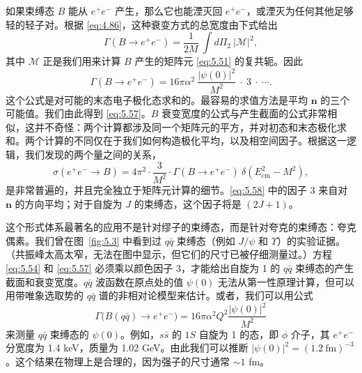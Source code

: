 如果束缚态 $B$ 能从 $e^{+}e^{-}$ 产生，那么它也能湮灭回 $e^{+}e^{-}$，或湮灭为任何其他足够轻的轻子对。根据 \eqref{eq:4.86}，这种衰变方式的总宽度由下式给出
\begin{equation}
  \Gamma(B \to e^{+}e^{-}) = \frac{1}{2M}\ \int d\Pi_2\ |\mathcal{M}|^2 ,
  \label{eq:5.55}
\end{equation}
其中 $\mathcal{M}$ 正是我们用来计算 $B$ 产生的矩阵元 \eqref{eq:5.51} 的复共轭。因此
\begin{equation}
  \Gamma(B \to e^{+}e^{-}) = 16\pi\alpha^2\ \frac{|\psi(0)|^2}{M^2}\
    \cdot\ 3\ \cdot\ \cdots .
  \label{eq:5.57}
\end{equation}
这个公式是对可能的末态电子极化态求和的。最容易的求值方法是平均 $\mathbf{n}$ 的三个可能值。我们由此得到 \eqref{eq:5.57}。$B$ 衰变宽度的公式与产生截面的公式非常相似，这并不奇怪：两个计算都涉及同一个矩阵元的平方，并对初态和末态极化求和。两个计算的不同仅在于我们如何构造极化平均，以及相空间因子。根据这一逻辑，我们发现的两个量之间的关系，
\begin{equation}
  \sigma(e^{+}e^{-}\to B) = 4\pi^2\cdot\frac{3}{M^2}\cdot
    \Gamma(B\to e^{+}e^{-})\ \delta(E^2_{\mathrm{cm}} - M^2),
  \label{eq:5.58}
\end{equation}
是非常普遍的，并且完全独立于矩阵元计算的细节。\eqref{eq:5.58} 中的因子 3 来自对 $\mathbf{n}$ 的方向平均；对于自旋为 $J$ 的束缚态，这个因子将是 $(2J+1)$。

这个形式体系最著名的应用不是针对缪子的束缚态，而是针对夸克的束缚态：夸克偶素。我们曾在图~\ref{fig:5.3} 中看到过 $q\bar{q}$ 束缚态（例如 $J/\psi$ 和 $\Upsilon$）的实验证据。（共振峰太高太窄，无法在图中显示，但它们的尺寸已被仔细测量过。）方程 \eqref{eq:5.54} 和 \eqref{eq:5.57} 必须乘以颜色因子 3，才能给出自旋为 1 的 $q\bar{q}$ 束缚态的产生截面和衰变宽度。$q\bar{q}$ 波函数在原点处的值 $\psi(0)$ 无法从第一性原理计算，但可以用带唯象选取势的 $q\bar{q}$ 谱的非相对论模型来估计。或者，我们可以用公式
\begin{equation}
  \Gamma\bigl( B(q\bar{q}) \to e^{+}e^{-} \bigr) = 16\pi\alpha^2 Q^2
    \frac{|\psi(0)|^2}{M^2}
  \label{eq:5.59}
\end{equation}
来测量 $q\bar{q}$ 束缚态的 $\psi(0)$。例如，$s\bar{s}$ 的 $1S$ 自旋为 1 的态，即 $\phi$ 介子，其 $e^{+}e^{-}$ 分宽度为 1.4 keV，质量为 1.02 GeV。由此我们可以推断 $|\psi(0)|^2 = (1.2\ \mathrm{fm})^{-3}$。这个结果在物理上是合理的，因为强子的尺寸通常 $\sim 1$ fm。

